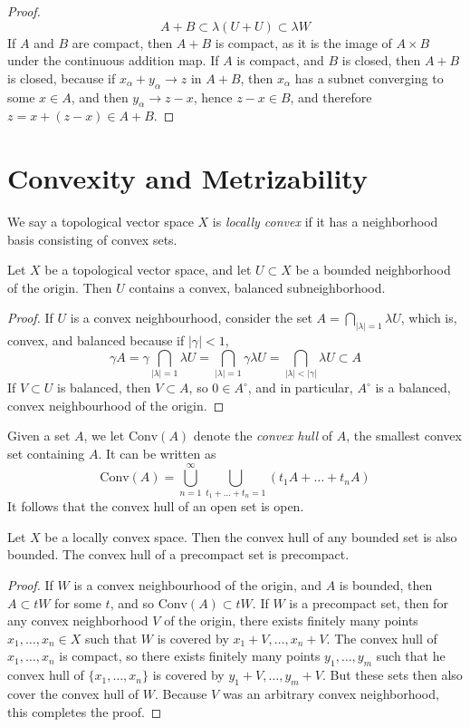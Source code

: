 \begin{proof}
    \[ A + B \subset \lambda(U + U) \subset \lambda W \]
    If $A$ and $B$ are compact, then $A + B$ is compact, as it is the image of $A \times B$ under the continuous addition map. If $A$ is compact, and $B$ is closed, then $A + B$ is closed, because if $x_\alpha + y_\alpha \to z$ in $A + B$, then $x_\alpha$ has a subnet converging to some $x \in A$, and then $y_\alpha \to z - x$, hence $z - x \in B$, and therefore $z = x + (z - x) \in A + B$.
\end{proof}




\section{Convexity and Metrizability}

We say a topological vector space $X$ is \emph{locally convex} if it has a neighborhood basis consisting of convex sets.

\begin{theorem}
    Let $X$ be a topological vector space, and let $U \subset X$ be a bounded neighborhood of the origin. Then $U$ contains a convex, balanced subneighborhood.
\end{theorem}
\begin{proof}
    If $U$ is a convex neighbourhood, consider the set $A = \bigcap_{|\lambda| = 1} \lambda U$, which is, convex, and balanced because if $|\gamma| < 1$,
    \[ \gamma A = \gamma \bigcap_{|\lambda| = 1} \lambda U = \bigcap_{|\lambda| = 1} \gamma \lambda U = \bigcap_{|\lambda| < |\gamma|} \lambda U \subset A \]
    If $V \subset U$ is balanced, then $V \subset A$, so $0 \in A^\circ$, and in particular, $A^\circ$ is a balanced, convex neighbourhood of the origin.
\end{proof}

Given a set $A$, we let $\text{Conv}(A)$ denote the \emph{convex hull} of $A$, the smallest convex set containing $A$. It can be written as
%
\[ \text{Conv}(A) = \bigcup_{n = 1}^\infty \bigcup_{t_1 + \dots + t_n = 1} (t_1A + \dots + t_nA) \]
%
It follows that the convex hull of an open set is open.

\begin{theorem}
    Let $X$ be a locally convex space. Then the convex hull of any bounded set is also bounded. The convex hull of a precompact set is precompact.
\end{theorem}
\begin{proof}
    If $W$ is a convex neighbourhood of the origin, and $A$ is bounded, then $A \subset tW$ for some $t$, and so $\text{Conv}(A) \subset tW$. If $W$ is a precompact set, then for any convex neighborhood $V$ of the origin, there exists finitely many points $x_1,\dots,x_n \in X$ such that $W$ is covered by $x_1 + V, \dots, x_n + V$. The convex hull of $x_1,\dots,x_n$ is compact, so there exists finitely many points $y_1,\dots,y_m$ such that he convex hull of $\{ x_1, \dots, x_n \}$ is covered by $y_1 + V, \dots, y_m + V$. But these sets then also cover the convex hull of $W$. Because $V$ was an arbitrary convex neighborhood, this completes the proof.
\end{proof}

